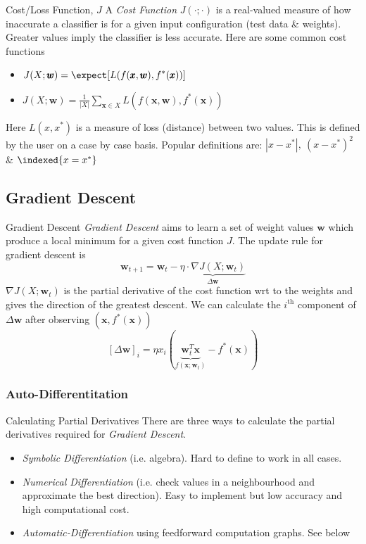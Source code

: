 \documentclass[11pt,a4paper]{article}
\begin{document}
\begin{definition}{Cost/Loss Function, $J$}
  A \textit{Cost Function} $J(\cdot;\cdot)$ is a real-valued measure of how inaccurate a classifier is for a given input configuration (test data \& weights). Greater values imply the classifier is less accurate. Here are some common cost functions
  \begin{itemize}
    \item[Expected Loss] $\displaystyle J(X;\pmb{w})=\expect[L(f(\pmb{x},\pmb{w}),f^*(\pmb{x}))]$
    \item[Empirical Risk] $\displaystyle J(X;\pmb{w})=\frac1{|X|}\sum_{\pmb{x}\in X}L(f(\pmb{x},\pmb{w}),f^*(\pmb{x}))$
  \end{itemize}
  Here $L(x,x^*)$ is a measure of loss (distance) between two values. This is defined by the user on a case by case basis. Popular definitions are: $|x-x^*|,\ (x-x^*)^2$ \& $\indexed\{x=x^*\}$
\end{definition}

\subsection{Gradient Descent}

\begin{definition}{Gradient Descent}
  \textit{Gradient Descent} aims to learn a set of weight values $\pmb{w}$ which produce a local minimum for a given cost function $J$. The update rule for gradient descent is
  \[ \pmb{w}_{t+1}=\pmb{w}_t-\underbrace{\eta\cdot\nabla J(X;\pmb{w}_t)}_{\Delta\pmb{w}} \]
  $\nabla J(X;\pmb{w}_t)$ is the partial derivative of the cost function wrt to the weights and gives the direction of the greatest descent. We can calculate the $i^\text{th}$ component of $\Delta\pmb{w}$ after observing $(\pmb{x},f^*(\pmb{x}))$
  \[ [\Delta\pmb{w}]_i=\eta x_i(\underbrace{\pmb{w}^T_t\pmb{x}}_{f(\pmb{x};\pmb{w}_t)}-f^*(\pmb{x})) \]
\end{definition}

\subsubsection{Auto-Differentitation}

\begin{proposition}{Calculating Partial Derivatives}
  There are three ways to calculate the partial derivatives required for \textit{Gradient Descent}.
  \begin{itemize}
    \item \textit{Symbolic Differentiation} (i.e. algebra). Hard to define to work in all cases.
    \item \textit{Numerical Differentiation} (i.e. check values in a neighbourhood and approximate the best direction). Easy to implement but low accuracy and high computational cost.
    \item \textit{Automatic-Differentiation} using feedforward computation graphs. See below
  \end{itemize}
\end{proposition}
\end{document}
